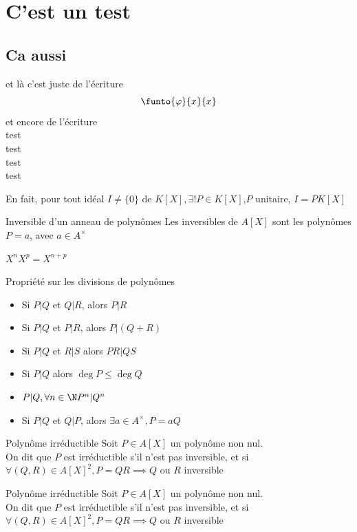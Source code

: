 
\chapter{C'est un test}

\section{Ca aussi}

et là c'est juste de l'écriture
\[\funto{\varphi}{x}{x}\]
et encore de l'écriture\\
test\\ test\\ test\\ test


\begin{re}{}{}
En fait, pour tout idéal $I\neq\{0\}$ de $K[X],\exists!P\in K[X]$,$P$ unitaire, \tq $I=P K[X]$
\end{re}

\begin{prop}{Inversible d'un anneau de polynômes}{}
Les inversibles de $A[X]$ sont les polynômes $P=a$, avec $a\in A^\times$
\end{prop}

\begin{prop}{}{}
$X^nX^p=X^{n+p}$
\end{prop}
\begin{prop}{Propriété sur les divisions de polynômes}{}
\begin{itemize}
            \item Si $P|Q$ et $Q|R$, alors $P|R$
            \item Si $P|Q$ et $P|R$, alors $P|(Q+R)$
            \item Si $P|Q$ et $R|S$ alors $PR|QS$
            \item Si $P|Q$ alors $\deg P \le \deg Q$
            \item $P|Q, \forall n\in\N P^n|Q^n$
            \item Si $P|Q$ et $Q|P$, alors $\exists a\in A^\times,P=aQ$
        \end{itemize}
\end{prop}
\begin{df}{Polynôme irréductible}{}
Soit $P\in A[X]$ un polynôme non nul.\\
        On dit que $P$ est irréductible s'il n'est pas inversible, et si \\$\forall(Q,R)\in A[X]^2,P=QR\implies Q$ ou $R$ inversible
\end{df}

\begin{df}{Polynôme irréductible}{}
Soit $P\in A[X]$ un polynôme non nul.\\
        On dit que $P$ est irréductible s'il n'est pas inversible, et si \\$\forall(Q,R)\in A[X]^2,P=QR\implies Q$ ou $R$ inversible
\end{df}
